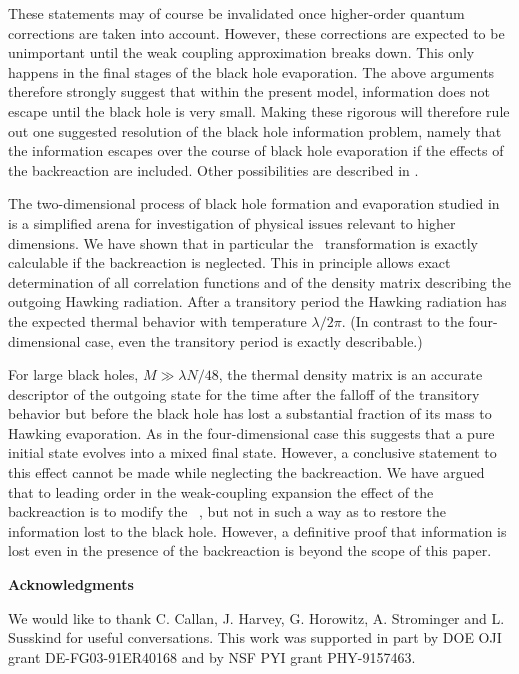 These statements may of course be invalidated once higher-order quantum
corrections are taken into account.  However, these corrections are
expected to be unimportant until the weak coupling approximation breaks
down.  This only happens in the final stages of the black hole evaporation.
The above arguments therefore strongly suggest that within the present
model, information does not escape
until the black hole is very small.
Making these rigorous will therefore
rule out one suggested resolution of the black hole information problem,
namely that the information escapes over the course of black hole
evaporation
if
the effects of the backreaction are included.  Other possibilities are
described in .


The two-dimensional process of black hole formation and evaporation studied
in  is a simplified arena for investigation of physical issues
relevant to higher dimensions.  We have shown that in particular the \Bog\
transformation is exactly calculable if the backreaction is neglected.
This in principle allows exact determination of all correlation functions
and of the density matrix describing the outgoing Hawking radiation.
After a transitory period the Hawking radiation has the expected thermal
behavior with temperature $\lambda/2\pi$.  (In contrast to the
four-dimensional case, even the transitory period is exactly describable.)

For large black holes, $M\gg \lambda N/48$, the thermal density matrix is
an accurate descriptor of the outgoing state for the time after the
falloff of the transitory behavior but before the black hole has lost a
substantial fraction of its mass to Hawking evaporation.  As in the
four-dimensional case this suggests that a pure initial state
evolves into a mixed final state.
However, a conclusive statement to this
effect cannot be made while neglecting the backreaction.  We have argued
that to leading order in the weak-coupling expansion the effect of the
backreaction is to modify the \Bog\ \Xm, but not in such a way as to
restore the information lost to the black hole.  However, a definitive
proof that information is lost even in the presence of the backreaction is
beyond the scope of this paper.

\bigskip\bigskip\centerline{{\bf Acknowledgments}}\nobreak
We would like to thank C. Callan, J. Harvey, G. Horowitz,
A. Strominger and L. Susskind for useful
conversations.  This work was supported in
part by DOE OJI grant DE-FG03-91ER40168
and by NSF PYI grant PHY-9157463.

